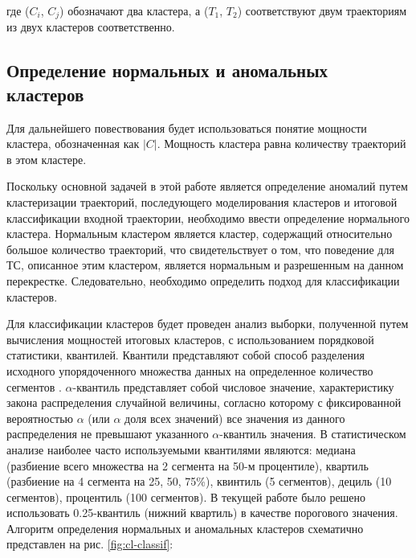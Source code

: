 где ($C_i$, $C_j$) обозначают два кластера, а ($T_1$, $T_2$) соответствуют двум траекториям из двух кластеров соответственно.

\subsection{Определение нормальных и аномальных кластеров}

Для дальнейшего повествования будет использоваться понятие мощности кластера, обозначенная как $|C|$. Мощность кластера равна количеству траекторий в этом кластере.

Поскольку основной задачей в этой работе является определение аномалий путем кластеризации траекторий, последующего моделирования кластеров и итоговой классификации входной траектории, необходимо ввести определение нормального кластера. Нормальным кластером является кластер, содержащий относительно большое количество траекторий, что свидетельствует о том, что поведение для ТС, описанное этим кластером, является нормальным и разрешенным на данном перекрестке. Следовательно, необходимо определить подход для классификации кластеров.

Для классификации кластеров будет проведен анализ выборки, полученной путем вычисления мощностей итоговых кластеров, с использованием порядковой статистики, квантилей. Квантили представляют собой способ разделения исходного упорядоченного множества данных на определенное количество сегментов \cite{inbook:stats}. $\alpha$-квантиль представляет собой числовое значение, характеристику закона распределения случайной величины, согласно которому с фиксированной вероятностью $\alpha$ (или $\alpha$ доля всех значений) все значения из данного распределения не превышают указанного $\alpha$-квантиль значения. В статистическом анализе наиболее часто используемыми квантилями являются: медиана (разбиение всего множества на 2 сегмента на 50-м процентиле), квартиль (разбиение на 4 сегмента на 25, 50, 75\%), квинтиль (5 сегментов), дециль (10 сегментов), процентиль (100 сегментов). В текущей работе было решено использовать 0.25-квантиль (нижний квартиль) в качестве порогового значения. Алгоритм определения нормальных и аномальных кластеров схематично представлен на рис. \ref{fig:cl-classif}:


